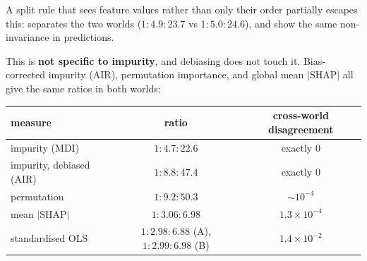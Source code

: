 
A split rule that sees feature values rather than only their order partially
escapes this:  separates the two worlds
($1:4.9:23.7$ vs $1:5.0:24.6$), and \citet{galili2016} show the same
non-invariance in predictions.

This is \textbf{not specific to impurity}, and debiasing does not touch it.
Bias-corrected impurity (AIR), permutation importance, and global mean
$|\text{SHAP}|$ all give the same ratios in both worlds:

\begin{center}
\begin{tabular}{lcc}
\toprule
measure & ratio & cross-world disagreement \\
\midrule
impurity (MDI)            & $1:4.7:22.6$   & exactly $0$ \\
impurity, debiased (AIR)  & $1:8.8:47.4$   & exactly $0$ \\
permutation               & $1:9.2:50.3$   & ${\sim}10^{-4}$ \\
mean $|\text{SHAP}|$      & $1:3.06:6.98$  & $1.3 \times 10^{-4}$ \\
\midrule
standardised OLS          & $1:2.98:6.88$ (A), $1:2.99:6.98$ (B) & $1.4 \times
10^{-2}$ \\
\bottomrule
\end{tabular}
\end{center}

